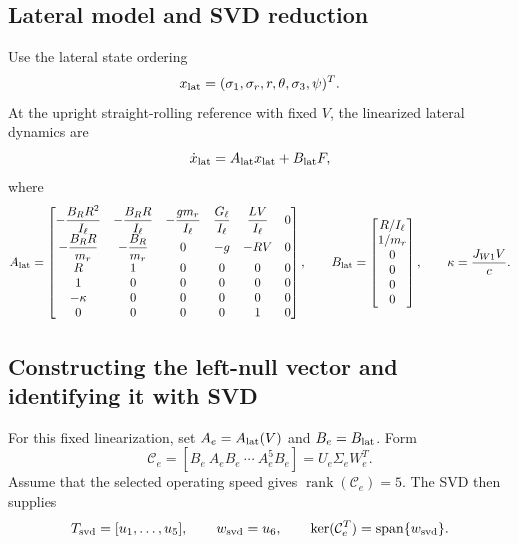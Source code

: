 \subsection{Lateral model and SVD reduction}

Use the lateral state ordering
\begin{equation}
x_{\rm lat}
=(\sigma_1,\sigma_r,r,\theta,\sigma_3,\psi)^T.
\end{equation}
At the upright straight-rolling reference with fixed $V$,
the linearized lateral dynamics are
\begin{equation}
\dot x_{\rm lat}=A_{\rm lat}x_{\rm lat}+B_{\rm lat}F,
\end{equation}
where
\begin{equation}
A_{\rm lat}=
\begin{bmatrix}
-\dfrac{B_RR^2}{I_\ell}
&-\dfrac{B_RR}{I_\ell}
&-\dfrac{gm_r}{I_\ell}
&\dfrac{G_\ell}{I_\ell}
&\dfrac{LV}{I_\ell}&0\\
-\dfrac{B_RR}{m_r}
&-\dfrac{B_R}{m_r}
&0&-g&-RV&0\\
R&1&0&0&0&0\\
1&0&0&0&0&0\\
-\kappa&0&0&0&0&0\\
0&0&0&0&1&0
\end{bmatrix},
\qquad
B_{\rm lat}=
\begin{bmatrix}
R/I_\ell\\
1/m_r\\
0\\
0\\
0\\
0
\end{bmatrix},
\qquad
\kappa=\frac{J_{W1}V}{c}.
\end{equation}

\subsection{Constructing the left-null vector and identifying it with SVD}

For this fixed linearization, set $A_e=A_{\rm lat}(V)$ and
$B_e=B_{\rm lat}$. Form
\begin{equation}
\mathcal C_e=[B_e\ A_eB_e\ \cdots\ A_e^5B_e]
=U_e\Sigma_eW_e^T.
\end{equation}
Assume that the selected operating speed gives
$\operatorname{rank}(\mathcal C_e)=5$. The SVD then supplies
\begin{equation}
T_{\rm svd}=[u_1,\ldots,u_5],\qquad
w_{\rm svd}=u_6,\qquad
\ker(\mathcal C_e^T)=\operatorname{span}\{w_{\rm svd}\}.
\end{equation}

